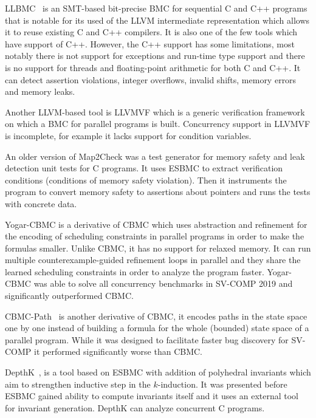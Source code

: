 LLBMC~ is an SMT-based bit-precise BMC for
sequential C and C++ programs that is notable for its used of the LLVM
intermediate representation which allows it to reuse existing C and C++
compilers.
It is also one of the few tools which have support of C++.
However, the C++ support has some limitations, most notably there is not
support for exceptions and run-time type support and there is no support for
threads and floating-point arithmetic for both C and C++.
It can detect assertion violations, integer overflows, invalid shifts, memory
errors and memory leaks.

Another LLVM-based tool is LLVMVF  which is a generic verification framework on which a BMC for parallel programs is built.
Concurrency support in LLVMVF is incomplete, for example it lacks support for condition variables.

An older version of Map2Check  was a test generator for memory safety and leak detection unit tests for C programs.
It uses ESBMC to extract verification conditions (conditions of memory safety violation).
Then it instruments the program to convert memory safety to assertions about pointers and runs the tests with concrete data.

Yogar-CBMC  is a derivative of CBMC which uses
abstraction and refinement for the encoding of scheduling constraints in
parallel programs in order to make the formulas smaller.
Unlike CBMC, it has no support for relaxed memory.
It can run multiple counterexample-guided refinement loops in parallel and they
share the learned scheduling constraints in order to analyze the program
faster.
Yogar-CBMC was able to solve all concurrency benchmarks in SV-COMP 2019 and significantly outperformed CBMC.

CBMC-Path~ is another derivative of CBMC, it encodes paths in
the state space one by one instead of building a formula for the whole
(bounded) state space of a parallel program.
While it was designed to facilitate faster bug discovery for SV-COMP it performed significantly worse than CBMC.

DepthK~, is a tool based on ESBMC with
addition of polyhedral invariants which aim to strengthen inductive step in the
$k$-induction.
It was presented before ESBMC gained ability to compute invariants itself and it uses an external tool for invariant generation.
DepthK can analyze concurrent C programs.

